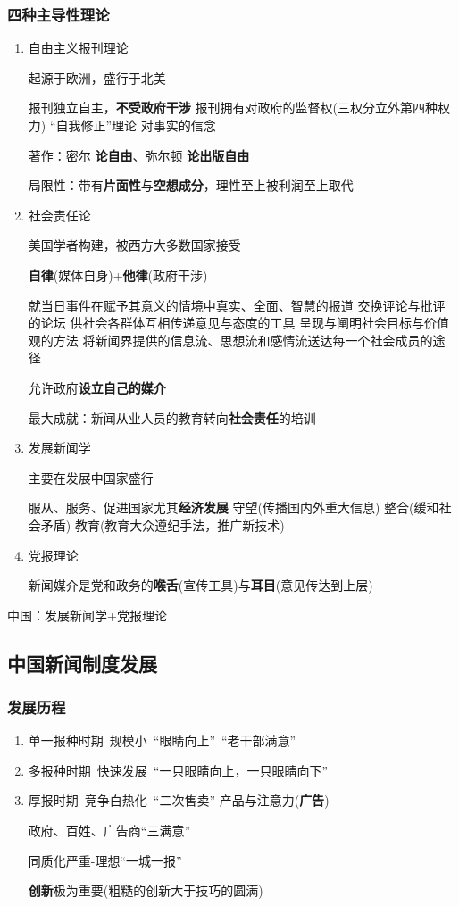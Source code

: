 \documentclass[a4paper,UTF8]{ctexart}
\begin{document}
\subsubsection{四种主导性理论}
\begin{enumerate}
	\item 自由主义报刊理论
	
	起源于欧洲，盛行于北美
	
	\subitem 报刊独立自主，\textbf{不受政府干涉}
	\subitem 报刊拥有对政府的监督权(三权分立外第四种权力)
	\subitem “自我修正”理论
	\subitem 对事实的信念
	
	著作：密尔 \textbf{论自由}、弥尔顿 \textbf{论出版自由}
	
	局限性：带有\textbf{片面性}与\textbf{空想成分}，理性至上被利润至上取代
	
	\item 社会责任论
	
	美国学者构建，被西方大多数国家接受
	
	\textbf{自律}(媒体自身)+\textbf{他律}(政府干涉)
	
	\subitem 就当日事件在赋予其意义的情境中真实、全面、智慧的报道
	\subitem 交换评论与批评的论坛
	\subitem 供社会各群体互相传递意见与态度的工具
	\subitem 呈现与阐明社会目标与价值观的方法
	\subitem 将新闻界提供的信息流、思想流和感情流送达每一个社会成员的途径
	
	允许政府\textbf{设立自己的媒介}
	
	最大成就：新闻从业人员的教育转向\textbf{社会责任}的培训
	
	\item 发展新闻学
	
	主要在发展中国家盛行
	
	\subitem 服从、服务、促进国家尤其\textbf{经济发展}
	\subitem 守望(传播国内外重大信息)
	\subitem 整合(缓和社会矛盾)
	\subitem 教育(教育大众遵纪手法，推广新技术)
	
	\item 党报理论
	
	新闻媒介是党和政务的\textbf{喉舌}(宣传工具)与\textbf{耳目}(意见传达到上层)
\end{enumerate}

中国：发展新闻学+党报理论

\subsection{中国新闻制度发展}
\subsubsection{发展历程}
\begin{enumerate}
	\item 单一报种时期\ 规模小\  “眼睛向上”\ “老干部满意”
	\item 多报种时期\ 快速发展\ “一只眼睛向上，一只眼睛向下”
	\item 厚报时期\ 竞争白热化\ “二次售卖”-产品与注意力(\textbf{广告})
	
	政府、百姓、广告商“三满意”
	
	同质化严重-理想“一城一报”
	
	\textbf{创新}极为重要(粗糙的创新大于技巧的圆满)
\end{enumerate}
\end{document}

